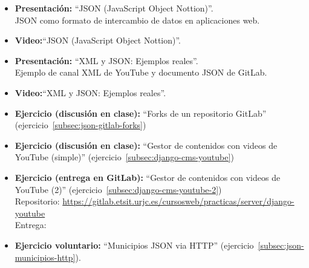 \documentclass[a4paper,12pt]{article}
\begin{document}
\begin{itemize}
\item \textbf{Presentación:} ``JSON (JavaScript Object Nottion)''. \\
  JSON como formato de intercambio de datos en aplicaciones web.
\item \textbf{Video:}``JSON (JavaScript Object Nottion)''.
\item \textbf{Presentación:} ``XML y JSON: Ejemplos reales''. \\
  Ejemplo de canal XML de YouTube y documento JSON de GitLab.
\item \textbf{Video:}``XML y JSON: Ejemplos reales''.
\item \textbf{Ejercicio (discusión en clase):} ``Forks de un repositorio GitLab''
  (ejercicio~\ref{subsec:json-gitlab-forks})
\item \textbf{Ejercicio (discusión en clase):} ``Gestor de contenidos con videos de YouTube (simple)'' (ejercicio~\ref{subsec:django-cms-youtube})
\item \textbf{Ejercicio (entrega en GitLab):} ``Gestor de contenidos con videos de YouTube (2)'' (ejercicio~\ref{subsec:django-cms-youtube-2}) \\
  Repositorio: \url{https://gitlab.etsit.urjc.es/cursosweb/practicas/server/django-youtube} \\
  Entrega: \juevesN
\item \textbf{Ejercicio voluntario:} ``Municipios JSON via HTTP'' (ejercicio~\ref{subsec:json-municipios-http}).
\end{itemize}

\end{document}
